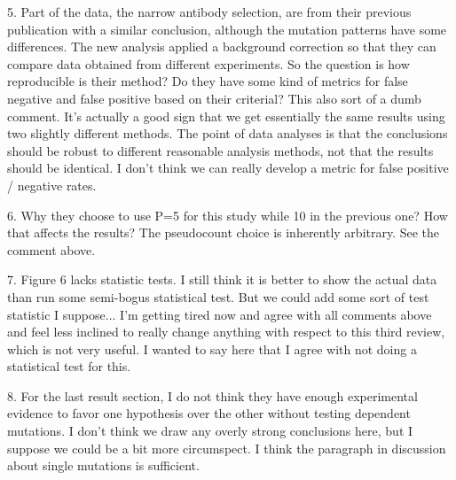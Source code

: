 \documentclass[11pt, oneside]{article}   	%
\begin{document}
5. Part of the data, the narrow antibody selection, are from their previous publication with a similar conclusion, although the mutation patterns have some differences. The new analysis applied a background correction so that they can compare data obtained from different experiments. So the question is how reproducible is their method? Do they have some kind of metrics for false negative and false positive based on their criterial?
{\color{red}
This also sort of a dumb comment.
It's actually a good sign that we get essentially the same results using two slightly different methods.
The point of data analyses is that the conclusions should be robust to different reasonable analysis methods, not that the results should be identical.
I don't think we can really develop a metric for false positive / negative rates.
}

6. Why they choose to use P=5 for this study while 10 in the previous one? How that affects the results?
{\color{red}
The pseudocount choice is inherently arbitrary.
See the comment above.
}

7. Figure 6 lacks statistic tests.
{\color{red}
I still think it is better to show the actual data than run some semi-bogus statistical test.
But we could add some sort of test statistic I suppose...}
{\color{blue} I'm getting tired now and agree with all comments above and feel less inclined to really change anything with respect to this third review, which is not very useful. I wanted to say here that I agree with not doing a statistical test for this.}

8. For the last result section, I do not think they have enough experimental evidence to favor one hypothesis over the other without testing dependent mutations.
{\color{red}
I don't think we draw any overly strong conclusions here, but I suppose we could be a bit more circumspect.
}
{\color{blue} I think the paragraph in discussion about single mutations is sufficient.}
\end{document}
